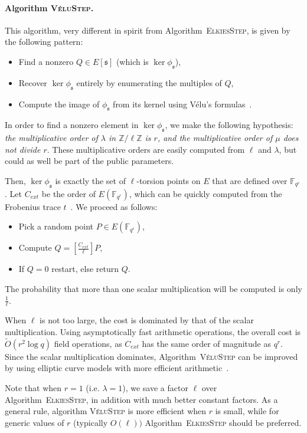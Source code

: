 \documentclass{article}
\newcommand{\F}{\mathbb{F}}
\newcommand{\Z}{\mathbb{Z}}
\newcommand{\softO}{\tilde{O}}
\newcommand{\algstyle}[1]{\textsc{#1}}
\renewcommand{\frak}{\mathfrak}
\theoremstyle{definition}
\begin{document}
\paragraph{Algorithm \algstyle{VéluStep}.} This algorithm, very different
in spirit from Algorithm~\algstyle{ElkiesStep}, is given by the following
pattern:
\begin{itemize}
\item Find a nonzero $Q\in E[\frak s]$ (which is $\ker \phi_{\frak s}$),
\item Recover $\ker \phi_{\frak s}$ entirely by enumerating the multiples of $Q$,
\item Compute the image of $\phi_{\frak s}$ from its kernel using
Vélu's formulas~\cite{todo:velu}.
\end{itemize}
In order to find a nonzero element in $\ker\phi_{\frak s}$, we make the
following hypothesis: \emph{the multiplicative order of $\lambda$ in
$\Z/\ell\Z$ is $r$, and the multiplicative order of $\mu$ does not
divide $r$}. These multiplicative orders are easily computed
from $\ell$ and $\lambda$, but could as well be part of the public
parameters.

Then, $\ker\phi_{\frak s}$ is exactly the set of $\ell$-torsion
points on $E$ that are defined over $\F_{q^r}$. Let $C_{ext}$ be the
order of $E(\F_{q^r})$, which can be quickly computed from the
Frobenius trace $t$~\cite{todo:hasseext}.
We proceed as follows:
\begin{itemize}
\item Pick a random point $P\in E(\F_{q^r})$,
\item Compute $Q = \left[\frac{C_{ext}}{\ell}\right]P$,
\item If $Q = 0$ restart, else return $Q$.
\end{itemize}
The probability that more than one scalar multiplication will be computed
is only $\frac{1}{\ell}$.

When $\ell$ is not too large, the cost is dominated by that of the scalar
multiplication. Using asymptotically fast arithmetic operations,
the overall cost is $\softO(r^2\log q)$ field operations, as $C_{ext}$
has the same order of magnitude as $q^r$. Since the scalar
multiplication dominates, Algorithm~\algstyle{VéluStep} can be improved
by using elliptic curve models with more efficient arithmetic~\cite{todo:curvearith}.

Note that when $r = 1$
(i.e. $\lambda = 1$), we save a factor $\ell$ over Algorithm~\algstyle{ElkiesStep},
in addition with much better constant factors. As a general rule,
algorithm \algstyle{VéluStep} is more efficient when $r$ is small, while
for generic values of $r$ (typically $O(\ell))$ Algorithm~\algstyle{ElkiesStep}
should be preferred.
\end{document}
